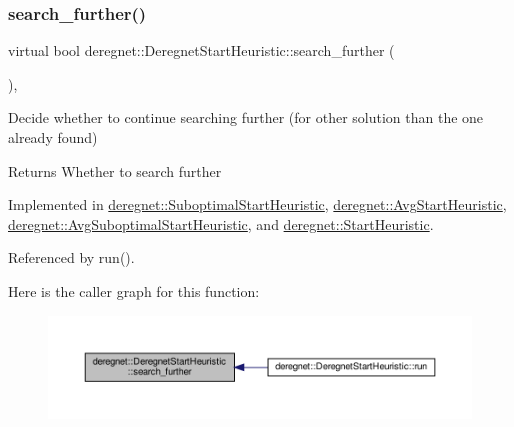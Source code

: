 \subsubsection{\texorpdfstring{search\+\_\+further()}{search\_further()}}
{\footnotesize\ttfamily virtual bool deregnet\+::\+Deregnet\+Start\+Heuristic\+::search\+\_\+further (\begin{DoxyParamCaption}{ }\end{DoxyParamCaption})\hspace{0.3cm}{\ttfamily [protected]}, {}}



Decide whether to continue searching further (for other solution than the one already found) 

\begin{DoxyReturn}{Returns}
Whether to search further 
\end{DoxyReturn}


Implemented in \hyperlink{classderegnet_1_1SuboptimalStartHeuristic_afe38bb6e18c6fb1270537bab0d2a3158}{deregnet\+::\+Suboptimal\+Start\+Heuristic}, \hyperlink{classderegnet_1_1AvgStartHeuristic_a6fcfd578c66c01240d3484513a34bef6}{deregnet\+::\+Avg\+Start\+Heuristic}, \hyperlink{classderegnet_1_1AvgSuboptimalStartHeuristic_a668a9db07c0d29c9b3618487f25fe5f4}{deregnet\+::\+Avg\+Suboptimal\+Start\+Heuristic}, and \hyperlink{classderegnet_1_1StartHeuristic_acbc34cb7479d3e68d6ef0554b739fc52}{deregnet\+::\+Start\+Heuristic}.



Referenced by run().

Here is the caller graph for this function\+:\nopagebreak
\begin{figure}[H]
\begin{center}
\leavevmode
\includegraphics[width=350pt]{classderegnet_1_1DeregnetStartHeuristic_ac3ee2c3022512f9d4ec7a6b49358e60a_icgraph}
\end{center}
\end{figure}
\mbox{\label{classderegnet_1_1DeregnetStartHeuristic_a50179ff9db4d416b93ff41d1dcee1358}} 

